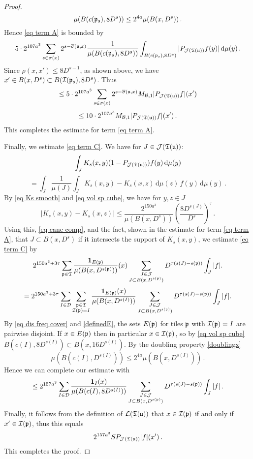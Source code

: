 \begin{proof}
    $$
        \mu(B(c(\mathfrak p_s), 8D^s)) \le 2^{4a} \mu(B(x, D^s))\,.
    $$
    Hence \eqref{eq term A} is bounded by
    $$
        5\cdot 2^{107a^3} \sum_{s\in\sigma(x)}2^{s - \overline{\sigma}(\mathfrak u, x)} \frac{1}{\mu(B(c(\mathfrak p_s),8D^s))}\int_{B(c(\mathfrak p_s),8D^s)}|P_{\mathcal{J}(\mathfrak T(\mathfrak u))}f(y)|\,\mathrm{d}\mu(y)\,.
    $$
    Since $\rho(x,x') \le 8 D^{s - 1}$, as shown above, we have $x' \in B(x, D^s) \subset B(\mathcal{I}(\mathfrak p_s), 8D^s)$. Thus
    $$
        \le 5\cdot 2^{107a^3} \sum_{s\in\sigma(x)}2^{s - \overline{\sigma}(\mathfrak u, x)} M_{\mathcal{B}, 1}|P_{\mathcal{J}(\mathfrak T(\mathfrak u))}f|(x')
    $$
    $$
        \le 10 \cdot 2^{107a^3} M_{\mathcal{B}, 1}|P_{\mathcal{J}(\mathfrak T(\mathfrak u))}f|(x')\,.
    $$
    This completes the estimate for term \eqref{eq term A}.


    Finally, we estimate \eqref{eq term C}. We have for $J \in \mathcal{J}(\mathfrak T(\mathfrak u))$:
    $$
        \int_J K_{s}(x,y)(1 - P_{\mathcal{J}(\mathfrak T(\mathfrak u))})f(y) \, \mathrm{d}\mu(y)
    $$
    \begin{equation}
    \label{eq canc comp}
        =  \int_J \frac{1}{\mu(J)} \int_J K_s(x,y) - K_s(x,z) \, \mathrm{d}\mu(z) \,f(y) \, \mathrm{d}\mu(y)\,.
    \end{equation}
    By \eqref{eq Ks smooth} and \eqref{eq vol sp cube}, we have for $y, z \in J$
    $$
        |K_s(x,y) - K_s(x,z)| \le \frac{2^{150a^3}}{\mu(B(x, D^s))} \left(\frac{8 D^{s(J)}}{D^s}\right)^\tau\,.
    $$
    Using this, \eqref{eq canc comp}, and the fact, shown in the estimate for term \eqref{eq term A}, that $J \subset B(x, D^s)$ if it intersects the support of $K_s(x,y)$, we estimate \eqref{eq term C} by
    $$
        2^{150a^3 + 3\tau}\sum_{\mathfrak p\in \mathfrak{T}}\frac{\mathbf{1}_{E(\mathfrak p)}}{\mu(B(x,D^{s(\mathfrak p)}))}(x)\sum_{\substack{J\in \mathcal{J}\\J\subset B(x,  D^{s(\mathfrak p)})}}  D^{\tau(s(J) - s(\mathfrak p))} \int_J |f|.
    $$
    $$
        = 2^{150a^3 + 3\tau}\sum_{I \in \mathcal{D}} \sum_{\substack{\mathfrak p\in \mathfrak{T}\\ \mathcal{I}(\mathfrak p) = I}}\frac{\mathbf{1}_{E(\mathfrak p)}(x)}{\mu(B(x, D^{s(I)}))}\sum_{\substack{J\in \mathcal{J}\\J\subset B(x,  D^{s(\mathfrak p)})}}  D^{\tau(s(J) - s(\mathfrak p))} \int_J |f|.
    $$
    By \eqref{eq dis freq cover} and \eqref{definedE}, the sets $E(\mathfrak p)$ for tiles $\mathfrak p$ with $\mathcal{I}(\mathfrak p) = I$ are pairwise disjoint.
    If $x \in E(\mathfrak p)$ then in particular $x \in \mathcal{I}(\mathfrak p)$, so by \eqref{eq vol sp cube} $B(c(I),8D^{s(I)}) \subset B(x, 16D^{s(I)})$. By the doubling property \eqref{doublingx}
    $$
        \mu(B(c(I), D^{s(I)})) \le 2^{4a} \mu(B(x, D^{s(I)}))\,.
    $$
    Hence we can complete our estimate with
    $$
        \le 2^{157a^3}\sum_{I \in \mathcal{D}} \frac{\mathbf{1}_{I}(x)}{\mu(B(c(I),  8D^{s(I)}))}\sum_{\substack{J\in \mathcal{J}\\J\subset B(x,  D^{s(\mathfrak p)})}}  D^{\tau(s(J) - s(\mathfrak p))} \int_J |f|\,.
    $$
    Finally, it follows from the definition of $\mathcal{L}(\mathfrak T(\mathfrak u))$ that $x \in \mathcal{I}(\mathfrak p)$ if and only if $x' \in \mathcal{I}(\mathfrak p)$, thus this equals
    $$
         2^{157a^3} S P_{\mathcal{J}(\mathfrak T(\mathfrak u))}|f|(x')\,.
    $$
    This completes the proof.
\end{proof}

